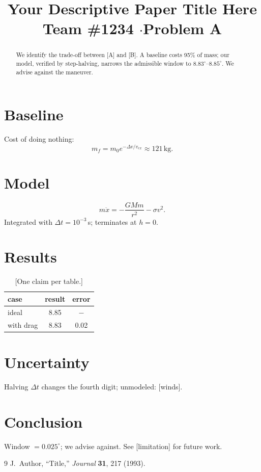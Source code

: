 \documentclass[11pt,a4paper]{article}
\title{\bfseries Your Descriptive Paper Title Here\\[4pt]
       \large Team \#1234 \quad$\cdot$\quad Problem A}
\author{}
\date{}
\numberwithin{equation}{section}
\newcommand{\unit}[1]{\,\mathrm{#1}}
\begin{document}
\maketitle

\begin{abstract}
\noindent
We identify the trade-off between [A] and [B]. A baseline costs 95\% of mass;
our model, verified by step-halving, narrows the admissible window to
$8.83^\circ$--$8.85^\circ$. We advise against the maneuver.
\end{abstract}

\section{Baseline}
Cost of doing nothing:
\begin{equation}
  m_f = m_0 e^{-\Delta v/v_{ex}} \approx 121\unit{kg}.
\end{equation}

\section{Model}
\begin{equation}
  m\ddot{x} = -\frac{GMm}{r^2} - \sigma v^2 .
\end{equation}
Integrated with $\Delta t = 10^{-3}$\,s; terminates at $h=0$.

\section{Results}
\begin{table}[h]
  \centering
  \caption{[One claim per table.]}
  \begin{tabular}{lcc}
    \toprule
    case & result & error \\
    \midrule
    ideal     & 8.85 & $-$ \\
    with drag & 8.83 & 0.02 \\
    \bottomrule
  \end{tabular}
\end{table}

\section{Uncertainty}
Halving $\Delta t$ changes the fourth digit; unmodeled: [winds].

\section{Conclusion}
Window $= 0.025^\circ$; we advise against. See [limitation] for future work.

\begin{thebibliography}{9}
 J.~Author, ``Title,'' \emph{Journal} \textbf{31}, 217 (1993).
\end{thebibliography}
\end{document}
